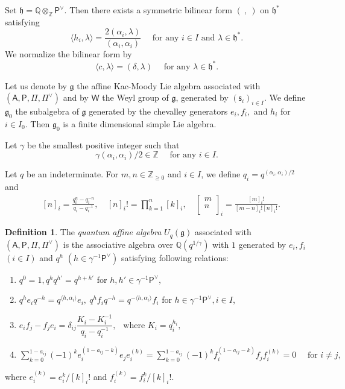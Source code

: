 \documentclass[11pt, leqno]{amsart}
\theoremstyle{definition}
\newtheorem{definition}[theorem]{Definition}
\numberwithin{equation}{section}
\begin{document}
Set ${\mathfrak h} = {\mathbb Q} {\mathop\otimes}_{\mathbb Z} {\mathsf{P}}^\vee$.
Then there exists a symmetric bilinear form $( \ , \ )$ on ${\mathfrak h}^*$ satisfying
$$ \langle h_i,\lambda \rangle = \dfrac{  2(\alpha_i,\lambda)}{(\alpha_i,\alpha_i)} \quad \text{ for any } i \in I \text{ and } \lambda \in {\mathfrak h}^*.$$
We normalize the bilinear form by
$$ \langle c,\lambda \rangle = (\delta,\lambda) \quad \text{ for any } \lambda \in {\mathfrak h}^*.$$

Let us denote by ${\mathfrak g}$ the affine Kac-Moody Lie algebra associated with $({\mathsf{A}},{\mathsf{P}},\Pi,\Pi^\vee)$ and by $\mathsf{W}$ the Weyl group of ${\mathfrak g}$, generated by
$(\mathsf{s}_i)_{i \in I}$. We define ${\mathfrak g}_0$ the subalgebra of ${\mathfrak g}$ generated by the chevalley generators $e_i,f_i,$ and
$h_i$ for $i \in I_0$. Then ${\mathfrak g}_0$ is a finite dimensional simple Lie algebra.

Let $\gamma$ be the smallest positive integer such that
$$ \gamma(\alpha_i,\alpha_i)/2 \in {\mathbb Z} \quad \text{ for any } i \in I.$$

Let $q$ be an indeterminate. For $m,n \in {\mathbb Z}_{\ge 0}$ and $i\in I$, we define
$q_i = q^{(\alpha_i,\alpha_i)/2}$ and
\begin{equation*}
 \begin{aligned}
 \ &[n]_i =\frac{ q^n_{i} - q^{-n}_{i} }{ q_{i} - q^{-1}_{i} },
 \ &[n]_i! = \prod^{n}_{k=1} [k]_i ,
 \ &\left[\begin{matrix}m \\ n\\ \end{matrix} \right]_i=  \frac{ [m]_i! }{[m-n]_i! [n]_i! }.
 \end{aligned}
\end{equation*}

\begin{definition} \label{Def: GKM}
The {\em quantum affine algebra} $U_q({\mathfrak g})$ associated
with $({\mathsf{A}},{\mathsf{P}},\Pi,\Pi^{\vee})$ is the associative
algebra over ${\mathbb Q}(q^{1/\gamma})$ with $1$ generated by $e_i,f_i$ $(i \in I)$ and
$q^{h}$ $(h \in \gamma^{-1}{\mathsf{P}}^{\vee})$ satisfying following relations:
\begin{enumerate}
  \item  $q^0=1, q^{h} q^{h'}=q^{h+h'} $ for $ h,h' \in \gamma^{-1}{\mathsf{P}}^{\vee},$
  \item  $q^{h}e_i q^{-h}= q^{\langle h, \alpha_i \rangle} e_i,
          \ q^{h}f_i q^{-h} = q^{-\langle h, \alpha_i \rangle }f_i$ for $h \in \gamma^{-1}{\mathsf{P}}^{\vee}, i \in I$,
  \item  $e_if_j - f_je_i =  \delta_{ij} \dfrac{K_i -K^{-1}_i}{q_i- q^{-1}_i }, \ \ \text{ where } K_i=q_i^{ h_i},$
  \item  $\displaystyle \sum^{1-a_{ij}}_{k=0}
  (-1)^ke^{(1-a_{ij}-k)}_i e_j e^{(k)}_i =  \sum^{1-a_{ij}}_{k=0} (-1)^k
  f^{(1-a_{ij}-k)}_i f_jf^{(k)}_i=0 \quad \text{ for }  i \ne j, $
\end{enumerate}
where $e_i^{(k)}=e_i^k/[k]_i!$ and $f_i^{(k)}=f_i^k/[k]_i!$.
\end{definition}
\end{document}
